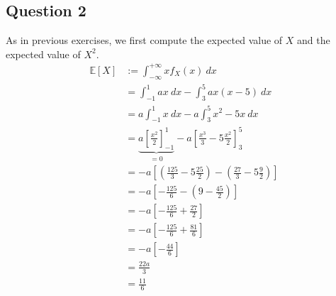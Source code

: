 \documentclass{article}
\newcommand{\E}{\mathbb{E}}
\begin{document}
\subsection{Question 2}
As in previous exercises, we first compute the expected value of \(X\) and the expected value of \(X^2\).
\begin{align*}
    \E[X]
     & := \int_{-\infty}^{+\infty} x f_X(x) \ dx                                                                            \\
     & = \int_{-1}^{1} ax \ dx - \int_{3}^{5} ax(x-5) \ dx                                                                  \\
     & = a \int_{-1}^{1} x \ dx - a \int_{3}^{5} x^2 - 5x \ dx                                                              \\
     & = \underbrace{a \left[ \frac{x^2}{2} \right]_{-1}^{1}}_{=0} - a \left[\frac{x^3}{3} - 5\frac{x^2}{2} \right]_{3}^{5} \\
     & = - a \left[\left( \frac{125}{3} - 5\frac{25}{2} \right) - \left( \frac{27}{3} - 5\frac{9}{2} \right)\right]         \\
     & = - a \left[- \frac{125}{6} - \left( 9 - \frac{45}{2} \right)\right]                                                 \\
     & = - a \left[- \frac{125}{6} + \frac{27}{2} \right]                                                                   \\
     & = - a \left[- \frac{125}{6} + \frac{81}{6} \right]                                                                   \\
     & = - a \left[- \frac{44}{6} \right]                                                                                   \\
     & = \frac{22a}{3}                                                                                                      \\
     & = \frac{11}{6}                                                                                                       \\
\end{align*}
\end{document}
